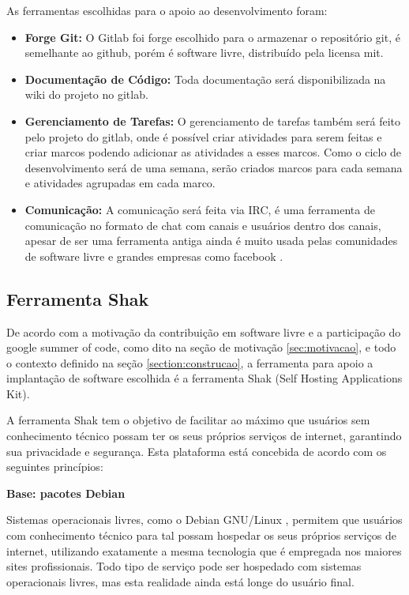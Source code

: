 As ferramentas escolhidas para o apoio ao desenvolvimento foram:
\begin{itemize}
  \item \textbf{Forge Git:} O Gitlab foi forge escolhido para o armazenar o
  repositório git, é semelhante ao github, porém é software livre, distribuído pela
  licensa mit\cite{gitlab}.
  \item \textbf{Documentação de Código:} Toda documentação será disponibilizada
  na wiki do projeto no gitlab.
  \item \textbf{Gerenciamento de Tarefas:} O gerenciamento de tarefas também será
  feito pelo projeto do gitlab, onde é possível criar atividades para serem feitas
  e criar marcos podendo adicionar as atividades a esses marcos. Como o ciclo de
  desenvolvimento será de uma semana, serão criados marcos para cada semana e atividades
  agrupadas em cada marco.
  \item \textbf{Comunicação:} A comunicação será feita via IRC, é uma ferramenta
  de comunicação no formato de chat com canais e usuários dentro dos canais,
  apesar de ser uma ferramenta antiga ainda é muito usada pelas comunidades de software
  livre e grandes empresas como facebook \cite{artigofacebook}.
\end{itemize}

\subsection{Ferramenta Shak}

De acordo com a motivação da contribuição em software livre
e a participação do google summer of code, como dito na seção de motivação
\ref{sec:motivacao}, e todo o contexto definido na seção \ref{section:construcao},
a ferramenta para apoio a implantação de software escolhida
é a ferramenta Shak (Self Hosting Applications Kit).

A ferramenta Shak tem o objetivo de facilitar ao máximo que usuários sem conhecimento
técnico possam ter os seus próprios serviços de internet, garantindo sua privacidade
e segurança. Esta plataforma está concebida de acordo com os seguintes princípios:

\textbf{Base: pacotes Debian}

Sistemas operacionais livres, como o Debian
GNU/Linux , permitem que usuários com conhecimento
técnico para tal possam hospedar os seus próprios serviços de internet,
utilizando exatamente a mesma tecnologia que é empregada nos maiores sites
profissionais. Todo tipo de serviço pode ser hospedado com sistemas
operacionais livres, mas esta realidade ainda está longe do usuário final.

